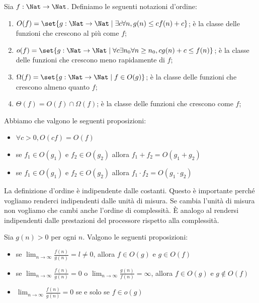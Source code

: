 \begin{defn}
    Sia $f: \Nat \to \Nat$. Definiamo le seguenti notazioni d'ordine:
    \begin{enumerate}
        \item $O(f) = \set{g:\Nat \to \Nat \mid \exists c \forall n, g(n) \leq c f(n) + c}$; è la
        classe delle funzioni che crescono al più come $f$;
        \item $o(f) = \set{g:\Nat \to \Nat \mid \forall c \exists n_{0} \forall n \geq n_{0}, c g(n)
        + c \leq f(n)}$; è la classe delle funzioni che crescono meno rapidamente di $f$;
        \item $\Omega(f) = \set{g:\Nat \to \Nat \mid f \in O(g)}$; è la classe delle funzioni che
        crescono almeno quanto $f$;
        \item $\Theta(f) = O(f) \cap \Omega(f)$; è la classe delle funzioni che crescono come $f$;
    \end{enumerate}
\end{defn}

Abbiamo che valgono le seguenti proposizioni:
\begin{itemize}
    \item $\forall c > 0, O(cf) = O(f)$ 
    \item se $f_{1} \in O(g_{1})$ e $f_{2} \in O(g_{2})$ allora $f_{1} + f_{2} = O(g_{1} + g_{2})$
    \item se $f_{1} \in O(g_{1})$ e $f_{2} \in O(g_{2})$ allora $f_{1}\cdot f_{2} = O(g_{1} \cdot g_{2})$
\end{itemize}

La definizione d'ordine è indipendente dalle costanti. Questo è importante perché vogliamo
renderci indipendenti dalle unità di misura. Se cambia l'unità di misura non vogliamo che cambi
anche l'ordine di complessità. È analogo al rendersi indipendenti dalle prestazioni del processore
rispetto alla complessità.

Sia $g(n) > 0$ per ogni $n$. Valgono le seguenti proposizioni:
\begin{itemize}
    \item se $\displaystyle\lim_{n \to \infty}\frac{f(n)}{g(n)} = l \not= 0$, allora $f \in O(g)$ e $g \in
    O(f)$
    \item se $\displaystyle\lim_{n \to \infty}\frac{f(n)}{g(n)} = 0$ o $\displaystyle\lim_{n \to \infty}\frac{g(n)}{f(n)} =
    \infty$, allora $f \in O(g)$ e $g \notin O(f)$
    \item $\displaystyle\lim_{n \to \infty}\frac{f(n)}{g(n)} = 0$ se e solo se $f \in o(g)$
\end{itemize}

